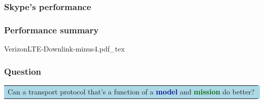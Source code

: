 \documentclass[svgnames]{beamer}
\begin{document}
\begin{frame}
\frametitle{Skype's performance}

\end{frame}

\begin{frame}
\frametitle{Performance summary}

{
\def\svgwidth{\columnwidth}\footnotesize{VerizonLTE-Downlink-minus4.pdf_tex}
}
\end{frame}

\begin{frame}
\frametitle{Question}

\begin{centering}
\colorbox{LightBlue}{
\begin{tabular}{p{4 in}}
\LARGE Can a transport protocol that's a function of
a \textbf{\textcolor{DarkBlue}{model}} and
\textbf{\textcolor{DarkGreen}{mission}} do better?
\end{tabular}}

\end{centering}

\end{frame}
\end{document}
